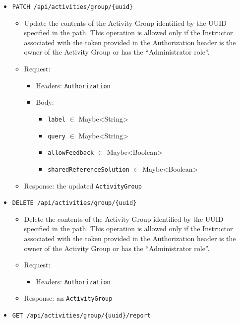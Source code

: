 \begin{chapterBody}
\begin{itemize}
    \item \texttt{PATCH /api/activities/group/\{uuid\}}
    \begin{itemize}
        \item Update the contents of the Activity Group identified by the
UUID specified in the path. This operation is allowed only if the Instructor
associated with the token provided in the Authorization header is the owner of
the Activity Group or has the ``Administrator role''.
        \item Request:
        \begin{itemize}
            \item Headers: \texttt{Authorization}
            \item Body:
            \begin{itemize}
                \item \texttt{label} $ \in $ Maybe<String>
                \item \texttt{query} $ \in $ Maybe<String>
                \item \texttt{allowFeedback} $ \in $ Maybe<Boolean>
                \item \texttt{sharedReferenceSolution} $ \in $ Maybe<Boolean>
            \end{itemize}
        \end{itemize}
        \item Response: the updated \texttt{ActivityGroup}
    \end{itemize}
    \item \texttt{DELETE /api/activities/group/\{uuid\}}
    \begin{itemize}
        \item Delete the contents of the Activity Group identified by the
UUID specified in the path. This operation is allowed only if the Instructor
associated with the token provided in the Authorization header is the owner of
the Activity Group or has the ``Administrator role''.
        \item Request:
        \begin{itemize}
            \item Headers: \texttt{Authorization}
        \end{itemize}
        \item Response: an \texttt{ActivityGroup}
    \end{itemize}
    \item \texttt{GET /api/activities/group/\{uuid\}/report}
    \begin{itemize}

\end{itemize}
\end{itemize}
\end{chapterBody}
